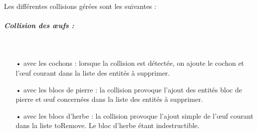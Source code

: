 \documentclass[a4paper,12pt]{report}
\begin{document}
\paragraph{}Les différentes collisions gérées sont les suivantes :

\subparagraph{Collision des œufs :}
~\\
\begin{itemize}
\item[•] avec les cochons : lorsque la collision est détectée, on ajoute le cochon et l'œuf courant dans la liste des entités à supprimer.
\item[•] avec les blocs de pierre : la collision provoque l'ajout des entités bloc de pierre et œuf concernées dans la liste des entités à supprimer.
\item[•] avec les blocs d'herbe : la collision provoque l'ajout simple de l’œuf courant dans la liste toRemove. Le bloc d'herbe étant indestructible.
\end{itemize}
\end{document}
